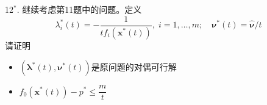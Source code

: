 
\begin{frame}

12$^*$. 继续考虑第11题中的问题。定义
$$\lambda_i^*(t) = - \dfrac{1}{tf_i(\mathbf{x}^*(t))}, \; i = 1,\ldots,m; \quad \boldsymbol\nu^*(t) = \widehat{\boldsymbol\nu} / t$$
请证明
\begin{itemize}
\item[(1)] $(\boldsymbol\lambda^*(t), \boldsymbol\nu^*(t))$是原问题的对偶可行解
\item[(2)] $f_0(\mathbf{x}^*(t)) - p^* \le \dfrac{m}{t}$
\end{itemize}

\end{frame}












